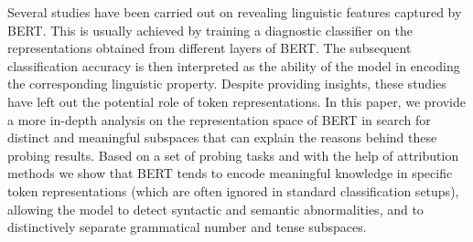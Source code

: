 Several studies have been carried out on revealing linguistic features captured by BERT. This is usually achieved by training a diagnostic classifier on the representations obtained from different layers of BERT. The subsequent classification accuracy is then interpreted as the ability of the model in encoding the corresponding linguistic property. Despite providing insights, these studies have left out the potential role of token representations. In this paper, we provide a more in-depth analysis on the representation space of BERT in search for distinct and meaningful subspaces that can explain the reasons behind these probing results. Based on a set of probing tasks and with the help of attribution methods we show that BERT tends to encode meaningful knowledge in specific token representations (which are often ignored in standard classification setups), allowing the model to detect syntactic and semantic abnormalities, and to distinctively separate grammatical number and tense subspaces.
